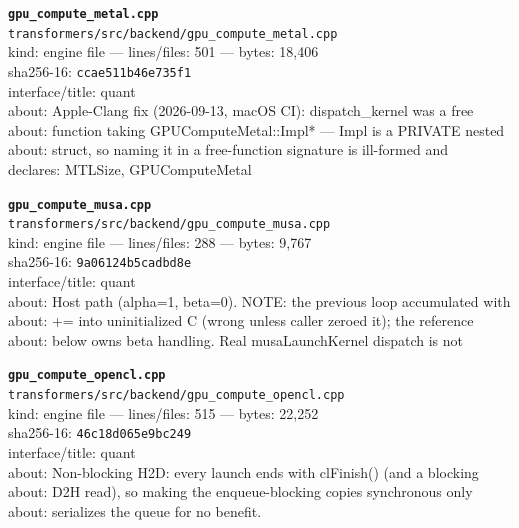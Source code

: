\noindent\textbf{\texttt{gpu\_compute\_metal.cpp}}\\
\texttt{transformers/src/backend/gpu\_compute\_metal.cpp}\\
kind: engine file --- lines/files: 501 --- bytes: 18,406\\
sha256-16: \texttt{ccae511b46e735f1}\\
interface/title: quant\\
about: Apple-Clang fix (2026-09-13, macOS CI): dispatch\_kernel was a free\\
about: function taking GPUComputeMetal::Impl* — Impl is a PRIVATE nested\\
about: struct, so naming it in a free-function signature is ill-formed and\\
declares: MTLSize, GPUComputeMetal\\
\vspace*{6.0pt}
\newpage

\noindent\textbf{\texttt{gpu\_compute\_musa.cpp}}\\
\texttt{transformers/src/backend/gpu\_compute\_musa.cpp}\\
kind: engine file --- lines/files: 288 --- bytes: 9,767\\
sha256-16: \texttt{9a06124b5cadbd8e}\\
interface/title: quant\\
about: Host path (alpha=1, beta=0). NOTE: the previous loop accumulated with\\
about: += into uninitialized C (wrong unless caller zeroed it); the reference\\
about: below owns beta handling. Real musaLaunchKernel dispatch is not\\
\vspace*{6.0pt}

\noindent\textbf{\texttt{gpu\_compute\_opencl.cpp}}\\
\texttt{transformers/src/backend/gpu\_compute\_opencl.cpp}\\
kind: engine file --- lines/files: 515 --- bytes: 22,252\\
sha256-16: \texttt{46c18d065e9bc249}\\
interface/title: quant\\
about: Non-blocking H2D: every launch ends with clFinish() (and a blocking\\
about: D2H read), so making the enqueue-blocking copies synchronous only\\
about: serializes the queue for no benefit.\\
\vspace*{6.0pt}

